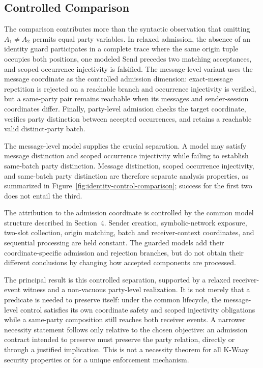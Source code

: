\subsection{Controlled Comparison}

The comparison contributes more than the syntactic observation that omitting
\(A_1\neq A_2\) permits equal party variables. In relaxed admission, the
absence of an identity guard participates in a complete trace where the same
origin tuple occupies both positions, one modeled Send precedes two matching
acceptances, and scoped occurrence injectivity is falsified. The
message-level variant uses the message coordinate as the controlled admission dimension:
exact-message repetition is rejected on a reachable branch and occurrence
injectivity is verified, but a same-party pair remains reachable when its
messages and sender-session coordinates differ. Finally, party-level
admission checks the target coordinate, verifies party distinction between
accepted occurrences, and retains a reachable valid distinct-party batch.



The message-level model supplies the crucial separation. A model may satisfy
message distinction and scoped occurrence injectivity while failing to
establish same-batch party distinction. Message distinction, scoped occurrence
injectivity, and same-batch party distinction are therefore separate analysis
properties, as summarized
in Figure~\ref{fig:identity-control-comparison}; success for the first two
does not entail the third.

The attribution to the admission coordinate is controlled by the common model
structure described in Section~4. Sender creation, symbolic-network exposure,
two-slot collection, origin matching, batch and receiver-context coordinates,
and sequential processing are held constant. The guarded models add their
coordinate-specific admission and rejection branches, but do not obtain their
different conclusions by changing how accepted components are processed.

The principal result is this controlled separation, supported by a relaxed
receiver-event witness and a non-vacuous party-level realization. It is not
merely that a predicate is needed to preserve itself: under the common
lifecycle, the message-level control satisfies its own coordinate safety and
scoped injectivity obligations while a same-party composition still reaches
both receiver events. A narrower necessity statement follows only relative
to the chosen objective: an admission contract intended to preserve
\distinctparty must preserve the party relation, directly or through a
justified implication. This is not a necessity theorem for all K-Waay security
properties or for a unique enforcement mechanism.

